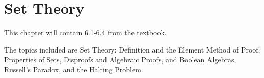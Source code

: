 \documentclass[../discrete.tex]{subfiles}
\begin{document}
\chapter{Set Theory}
This chapter will contain 6.1-6.4 from the textbook.

The topics included are Set Theory: Definition and the Element Method of Proof, Properties of Sets, Disproofs and Algebraic Proofs, and Boolean Algebras, Russell's Paradox, and the Halting Problem.
\end{document}
